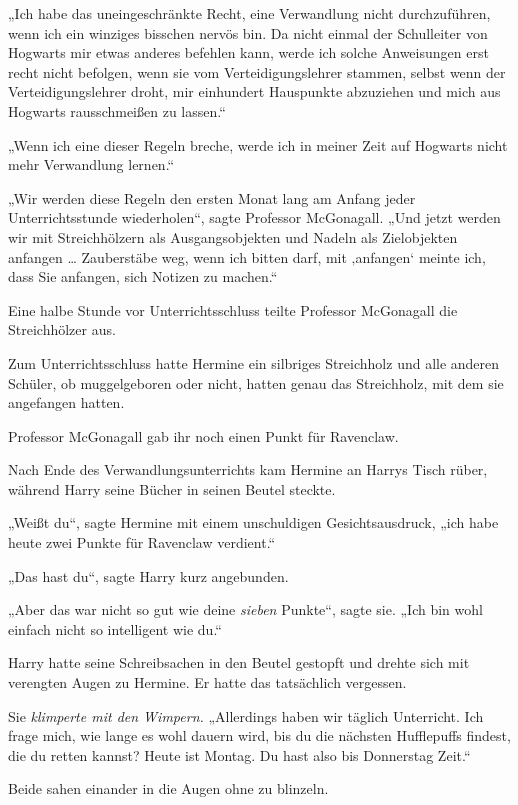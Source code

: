 {„Ich habe das uneingeschränkte Recht, eine Verwandlung nicht durchzuführen, wenn ich ein winziges bisschen nervös bin. Da nicht einmal der Schulleiter von Hogwarts mir etwas anderes befehlen kann, werde ich solche Anweisungen erst recht nicht befolgen, wenn sie vom Verteidigungslehrer stammen, selbst wenn der Verteidigungslehrer droht, mir einhundert Hauspunkte abzuziehen und mich aus Hogwarts rausschmeißen zu lassen.“

„Wenn ich eine dieser Regeln breche, werde ich in meiner Zeit auf Hogwarts nicht mehr Verwandlung lernen.“

„Wir werden diese Regeln den ersten Monat lang am Anfang jeder Unterrichtsstunde wiederholen“, sagte Professor McGonagall. „Und jetzt werden wir mit Streichhölzern als Ausgangsobjekten und Nadeln als Zielobjekten anfangen … Zauberstäbe weg, wenn ich bitten darf, mit ‚anfangen` meinte ich, dass Sie anfangen, sich Notizen zu machen.“

Eine halbe Stunde vor Unterrichtsschluss teilte Professor McGonagall die Streichhölzer aus.

Zum Unterrichtsschluss hatte Hermine ein silbriges Streichholz und alle anderen Schüler, ob muggelgeboren oder nicht, hatten genau das Streichholz, mit dem sie angefangen hatten.

Professor McGonagall gab ihr noch einen Punkt für Ravenclaw.

\later

Nach Ende des Verwandlungsunterrichts kam Hermine an Harrys Tisch rüber, während Harry seine Bücher in seinen Beutel steckte.

„Weißt du“, sagte Hermine mit einem unschuldigen Gesichtsausdruck, „ich habe heute zwei Punkte für Ravenclaw verdient.“

„Das hast du“, sagte Harry kurz angebunden.

„Aber das war nicht so gut wie deine \emph{sieben} Punkte“, sagte sie. „Ich bin wohl einfach nicht so intelligent wie du.“

Harry hatte seine Schreibsachen in den Beutel gestopft und drehte sich mit verengten Augen zu Hermine. Er hatte das tatsächlich vergessen.

Sie \emph{klimperte mit den Wimpern.} „Allerdings haben wir täglich Unterricht. Ich frage mich, wie lange es wohl dauern wird, bis du die nächsten Hufflepuffs findest, die du retten kannst? Heute ist Montag. Du hast also bis Donnerstag Zeit.“

Beide sahen einander in die Augen ohne zu blinzeln.

}
